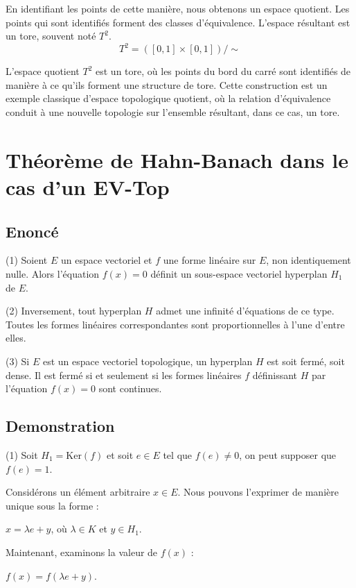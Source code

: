 \documentclass{article}
\theoremstyle{definition}
\theoremstyle{plain}
\begin{document}
En identifiant les points de cette manière, nous obtenons un espace quotient. Les points qui sont identifiés forment des classes d'équivalence. L'espace résultant est un tore, souvent noté $T^2$.
\[
T^2 = ([0, 1] \times [0, 1])/\sim
\]

L'espace quotient $T^2$ est un tore, où les points du bord du carré sont identifiés de manière à ce qu'ils forment une structure de tore. Cette construction est un exemple classique d'espace topologique quotient, où la relation d'équivalence conduit à une nouvelle topologie sur l'ensemble résultant, dans ce cas, un tore.


\section{Théorème de Hahn-Banach dans le cas d'un EV-Top}


\subsection{Enoncé}
\indent

(1) Soient $E$ un espace vectoriel et $f$ une forme linéaire sur $E$, non identiquement nulle. Alors l'équation $f(x) = 0$ définit un sous-espace vectoriel hyperplan $H_1$ de $E$.

(2) Inversement, tout hyperplan $H$ admet une infinité d'équations de ce type. Toutes les formes linéaires correspondantes sont proportionnelles à l'une d'entre elles.

(3) Si $E$ est un espace vectoriel topologique, un hyperplan $H$ est soit fermé, soit dense. Il est fermé si et seulement si les formes linéaires $f$ définissant $H$ par l'équation $f(x) = 0$ sont continues.

\subsection{Demonstration}

\indent


(1) Soit $H_1 = \text{Ker}(f)$ et soit $e \in E$ tel que $f(e) \neq 0$, on peut supposer que $f(e) = 1$.

Considérons un élément arbitraire $x \in E$. Nous pouvons l'exprimer de manière unique sous la forme :

$x = \lambda e + y$, où $\lambda \in K$ et $y \in H_1$.

Maintenant, examinons la valeur de $f(x)$ :

$f(x) = f(\lambda e + y)$.
\end{document}
